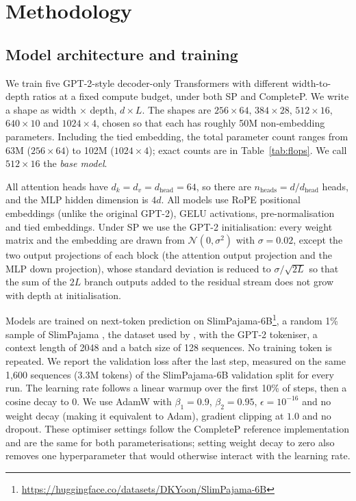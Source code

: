 \documentclass[10pt,twocolumn,a4paper]{article}
\newcommand{\sh}[2]{\ensuremath{#1{\times}#2}}  %
\begin{document}
\section{Methodology}\label{sec:method}

\subsection{Model architecture and training}

We train five GPT-2-style decoder-only Transformers with different width-to-depth ratios at a fixed compute budget, under both SP and CompleteP. We write a shape as width $\times$ depth, $d \times L$. The shapes are \sh{256}{64}, \sh{384}{28}, \sh{512}{16}, \sh{640}{10} and \sh{1024}{4}, chosen so that each has roughly 50M non-embedding parameters. Including the tied embedding, the total parameter count ranges from 63M (\sh{256}{64}) to 102M (\sh{1024}{4}); exact counts are in Table~\ref{tab:flops}. We call \sh{512}{16} the \emph{base model}.

All attention heads have $d_k = d_v = d_\text{head} = 64$, so there are $n_\text{heads} = d/d_\text{head}$ heads, and the MLP hidden dimension is $4d$. All models use RoPE positional embeddings (unlike the original GPT-2), GELU activations, pre-normalisation and tied embeddings. Under SP we use the GPT-2 initialisation: every weight matrix and the embedding are drawn from $\mathcal{N}(0, \sigma^2)$ with $\sigma = 0.02$, except the two output projections of each block (the attention output projection and the MLP down projection), whose standard deviation is reduced to $\sigma/\sqrt{2L}$ so that the sum of the $2L$ branch outputs added to the residual stream does not grow with depth at initialisation.

Models are trained on next-token prediction on SlimPajama-6B\footnote{\url{https://huggingface.co/datasets/DKYoon/SlimPajama-6B}}, a random 1\% sample of SlimPajama \citep{soboleva2023slimpajama}, the dataset used by \citet{dey2025completep}, with the GPT-2 tokeniser, a context length of 2048 and a batch size of 128 sequences. No training token is repeated. We report the validation loss after the last step, measured on the same 1,600 sequences (3.3M tokens) of the SlimPajama-6B validation split for every run. The learning rate follows a linear warmup over the first 10\% of steps, then a cosine decay to 0. We use AdamW with $\beta_1 = 0.9$, $\beta_2 = 0.95$, $\epsilon = 10^{-16}$ and no weight decay (making it equivalent to Adam), gradient clipping at $1.0$ and no dropout. These optimiser settings follow the CompleteP reference implementation and are the same for both parameterisations; setting weight decay to zero also removes one hyperparameter that would otherwise interact with the learning rate.
\end{document}

